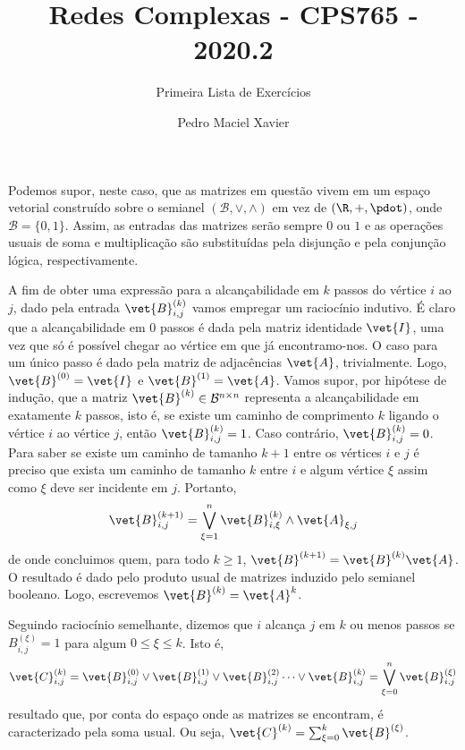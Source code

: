 \documentclass[l15, tikzdraw]{homework}
\title{Redes Complexas - CPS765 - 2020.2}
\subtitle{Primeira Lista de Exercícios}
\author{Pedro Maciel Xavier}
\begin{document}
	\maketitle*%

	Podemos supor, neste caso, que as matrizes em questão vivem em um espaço vetorial construído sobre o semianel $(\mathcal{B}, \vee, \wedge)$ em vez de $(\R, +, \pdot)$, onde $\mathcal{B} = \{0, 1\}$. Assim, as entradas das matrizes serão sempre $0$ ou $1$ e as operações usuais de soma e multiplicação são substituídas pela disjunção e pela conjunção lógica, respectivamente.
	
	\subsubquest%
	A fim de obter uma expressão para a alcançabilidade em $k$ passos do vértice $i$ ao $j$, dado pela entrada $\vet{B}_{i, j}^{(k)}$ vamos empregar um raciocínio indutivo. É claro que a alcançabilidade em $0$ passos é dada pela matriz identidade $\vet{I}$, uma vez que só é possível chegar ao vértice em que já encontramo-nos. O caso para um único passo é dado pela matriz de adjacências $\vet{A}$, trivialmente. Logo, $\vet{B}^{(0)} = \vet{I}$ e $\vet{B}^{(1)} = \vet{A}$. Vamos supor, por hipótese de indução, que a matriz $\vet{B}^{(k)} \in \mathcal{B}^{n \times n}$ representa a alcançabilidade em exatamente $k$ passos, isto é, se existe um caminho de comprimento $k$ ligando o vértice $i$ ao vértice $j$, então $\vet{B}^{(k)}_{i, j} = 1$. Caso contrário, $\vet{B}^{(k)}_{i, j} = 0$. Para saber se existe um caminho de tamanho $k + 1$ entre os vértices $i$ e $j$ é preciso que exista um caminho de tamanho $k$ entre $i$ e algum vértice $\xi$ assim como $\xi$ deve ser incidente em $j$. Portanto,%
		$$\vet{B}^{(k + 1)}_{i, j} = \bigvee_{\xi = 1}^{n} \vet{B}^{(k)}_{i, \xi} \wedge \vet{A}_{\xi, j}$$
	de onde concluimos quem, para todo $k \ge 1$, $\vet{B}^{(k + 1)}= \vet{B}^{(k)} \vet{A}$. O resultado é dado pelo produto usual de matrizes induzido pelo semianel booleano. Logo, escrevemos $\vet{B}^{(k)} = \vet{A}^{k}$.
	
	\subsubquest%
	Seguindo raciocínio semelhante, dizemos que $i$ alcança $j$ em $k$ ou menos passos se $B^{(\xi)}_{i,j} = 1$ para algum $0 \le \xi \le k$. Isto é,%
		$$\vet{C}_{i, j}^{(k)} = \vet{B}_{i, j}^{(0)} \vee \vet{B}_{i, j}^{(1)} \vee \vet{B}_{i, j}^{(2)} \dots \vee \vet{B}_{i, j}^{(k)} = \bigvee_{\xi = 0}^{n} \vet{B}_{i, j}^{(\xi)}$$
	resultado que, por conta do espaço onde as matrizes se encontram, é caracterizado pela soma usual. Ou seja, $\vet{C}^{(k)} = \sum_{\xi=0}^{k} \vet{B}^{(\xi)}$.
\end{document}
